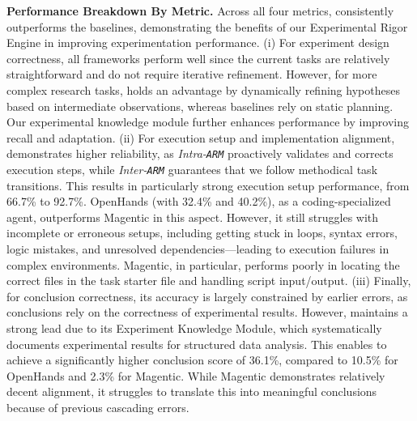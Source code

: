 \noindent\textbf{Performance Breakdown By Metric.} 
Across all four metrics, \sys consistently outperforms the baselines, demonstrating the benefits of our Experimental Rigor Engine in improving experimentation performance. 
(i) For experiment design correctness, all frameworks perform well since the current tasks are relatively straightforward and do not require iterative refinement.
However, for more complex research tasks, \sys holds an advantage by dynamically refining hypotheses based on intermediate observations, whereas baselines rely on static planning. Our experimental knowledge module further enhances performance by improving recall and adaptation.
(ii) For execution setup and implementation alignment, \sys demonstrates higher reliability, as \textit{Intra-\texttt{ARM}} proactively validates and corrects execution steps, while \textit{Inter-\texttt{ARM}} guarantees that we follow methodical task transitions. This results in particularly strong execution setup performance, from 66.7\% to 92.7\%.
OpenHands (with 32.4\% and 40.2\%), as a coding-specialized agent, outperforms Magentic in this aspect.
However, it still struggles with incomplete or erroneous setups, including getting stuck in loops, syntax errors, logic mistakes, and unresolved dependencies—leading to execution failures in complex environments. 
Magentic, in particular, performs poorly in locating the correct files in the task starter file and handling script input/output.
(iii) Finally, for conclusion correctness, its accuracy is largely constrained by earlier errors, as conclusions rely on the correctness of experimental results.
However, \sys maintains a strong lead due to its Experiment Knowledge Module, which systematically documents experimental results for structured data analysis. This enables \sys to achieve a significantly higher conclusion score of 36.1\%, compared to 10.5\% for OpenHands and 2.3\% for Magentic.
While Magentic demonstrates relatively decent alignment, it struggles to translate this into meaningful conclusions because of previous cascading errors.





